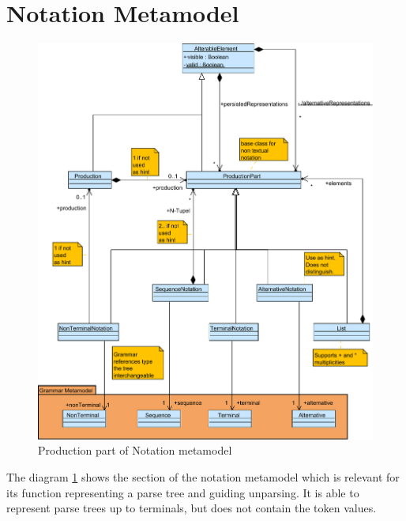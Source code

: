 \section{Notation Metamodel}
\begin{figure}
\centering
\includegraphics[scale=0.65]{gfx/ex/Notation_Prod} 
\caption{Production part of Notation metamodel}
\label{MM:Not:Prod}
\end{figure}

The diagram \ref{MM:Not:Prod} shows the section of the notation metamodel which is relevant for its function representing a parse tree and guiding unparsing. It is able to represent parse trees up to terminals, but does not contain the token values.\\


